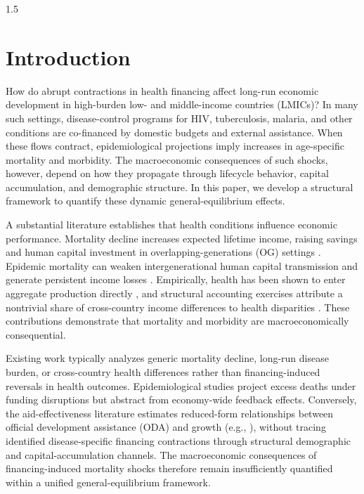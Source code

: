 \documentclass[letterpaper,12pt]{article}
\theoremstyle{definition}
\begin{document}
\begin{spacing}{1.5}


\newpage


\section{Introduction}
\label{SecIntro}

How do abrupt contractions in health financing affect long-run economic development in high-burden low- and middle-income countries (LMICs)? In many such settings, disease-control programs for HIV, tuberculosis, malaria, and other conditions are co-financed by domestic budgets and external assistance. When these flows contract, epidemiological projections imply increases in age-specific mortality and morbidity. The macroeconomic consequences of such shocks, however, depend on how they propagate through lifecycle behavior, capital accumulation, and demographic structure. In this paper, we develop a structural framework to quantify these dynamic general-equilibrium effects.

A substantial literature establishes that health conditions influence economic performance. Mortality decline increases expected lifetime income, raising savings and human capital investment in overlapping-generations (OG) settings \citep{kalemli-ozcan2000}. Epidemic mortality can weaken intergenerational human capital transmission and generate persistent income losses \citep{bell2006}. Empirically, health has been shown to enter aggregate production directly \citep{bloom2004}, and structural accounting exercises attribute a nontrivial share of cross-country income differences to health disparities \citep{Weil2007}. These contributions demonstrate that mortality and morbidity are macroeconomically consequential.

Existing work typically analyzes generic mortality decline, long-run disease burden, or cross-country health differences rather than financing-induced reversals in health outcomes. Epidemiological studies project excess deaths under funding disruptions but abstract from economy-wide feedback effects. Conversely, the aid-effectiveness literature estimates reduced-form relationships between official development assistance (ODA) and growth (e.g., \citep{BurnsideDollar:2000}), without tracing identified disease-specific financing contractions through structural demographic and capital-accumulation channels. The macroeconomic consequences of financing-induced mortality shocks therefore remain insufficiently quantified within a unified general-equilibrium framework.


\end{spacing}
\end{document}
